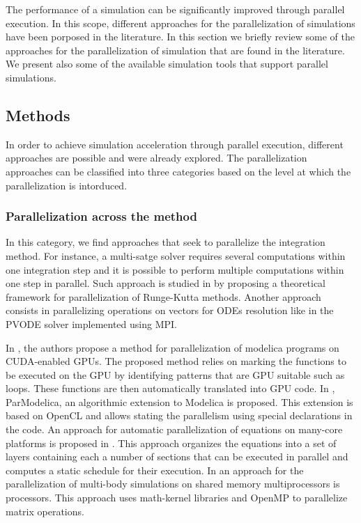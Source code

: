 The performance of a simulation can be significantly improved through parallel execution. In this scope, different approaches for the parallelization of simulations have been porposed in the literature. In this section we briefly review some of the approaches for the parallelization of simulation that are found in the literature. We present also some of the available simulation tools that support parallel simulations.

\subsection{Methods}

In order to achieve simulation acceleration through parallel execution, different approaches are possible and were already explored. The parallelization approaches can be classified into three categories based on the level at which the parallelization is intorduced.

\subsubsection{Parallelization across the method}
In this category, we find approaches that seek to parallelize the integration method. For instance, a multi-satge solver requires several computations within one integration step and it is possible to perform multiple computations within one step in parallel. Such approach is studied in \cite{iserles:1990} by proposing a theoretical framework for parallelization of Runge-Kutta methods. Another approach consists in parallelizing operations on vectors for ODEs resolution like in the PVODE solver \cite{byrne:1999} implemented using MPI. 

In \cite{elmqvist:2015}, the authors propose a method for parallelization of modelica programs on CUDA-enabled GPUs. The proposed method relies on marking the functions to be executed on the GPU by identifying patterns that are GPU suitable such as loops. These functions are then automatically translated into GPU code. In \cite{Gebremedhin2012}, ParModelica, an algorithmic extension to Modelica is proposed. This extension is based on OpenCL and allows stating the parallelism using special declarations in the code. An approach for automatic parallelization of equations on many-core platforms is proposed in \cite{elmqvist:2014}. This approach organizes the equations into a set of layers containing each a number of sections that can be executed in parallel and computes a static schedule for their execution. In \cite{clauberg:2012} an approach for the parallelization of multi-body simulations on shared memory multiprocessors is processors. This approach uses math-kernel libraries and OpenMP to parallelize matrix operations.

